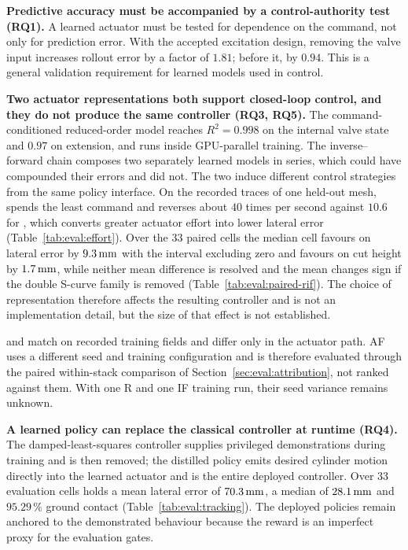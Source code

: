\textbf{Predictive accuracy must be accompanied by a control-authority test
(RQ1).} A learned actuator must be tested for dependence on the command, not
only for prediction error. With the accepted excitation design, removing the
valve input increases rollout error by a factor of $1.81$; before it, by $0.94$.
This is a general validation requirement for learned models used in control.

\textbf{Two actuator representations both support closed-loop control, and they
do not produce the same controller (RQ3, RQ5).} The command-conditioned
reduced-order model reaches $R^2 = 0.998$ on the internal valve state and $0.97$
on extension, and runs inside GPU-parallel training. The inverse--forward chain
composes two separately learned models in series, which could have compounded
their errors and did not. The two induce different control strategies from the
same policy interface. On the
recorded traces of one held-out mesh, \ppoROM{} spends the least command and
reverses about $40$ times per second against $10.6$ for \ppoIDFD{}, which
converts greater actuator effort into lower lateral error
(Table~\ref{tab:eval:effort}). Over the $33$ paired cells the median cell
favours \ppoIDFD{} on lateral error by $\unit[9.3]{mm}$ with the interval
excluding zero and favours \ppoROM{} on cut height by $\unit[1.7]{mm}$, while
neither mean difference is resolved and the mean changes sign if the double
S-curve family is removed (Table~\ref{tab:eval:paired-rif}). The choice of
representation therefore affects the resulting controller and is not an
implementation detail, but the size of that effect is not established.

\ppoROM{} and \ppoIDFD{} match on recorded training fields and differ only in
the actuator path. AF uses a different seed and training configuration and is
therefore evaluated through the paired within-stack comparison of
Section~\ref{sec:eval:attribution}, not ranked against them. With one R and one
IF training run, their seed variance remains unknown.

\textbf{A learned policy can replace the classical controller at runtime
(RQ4).} The damped-least-squares controller supplies privileged demonstrations
during training and is then removed; the distilled policy emits desired cylinder
motion directly into the learned actuator and is the entire deployed controller.
Over $33$ evaluation cells \ppoIDFD{} holds a mean lateral error of
$\unit[70.3]{mm}$, a median of $\unit[28.1]{mm}$ and $95.29\,\%$ ground contact
(Table~\ref{tab:eval:tracking}). The deployed policies remain anchored to the
demonstrated behaviour because the reward is an imperfect proxy for the
evaluation gates.

